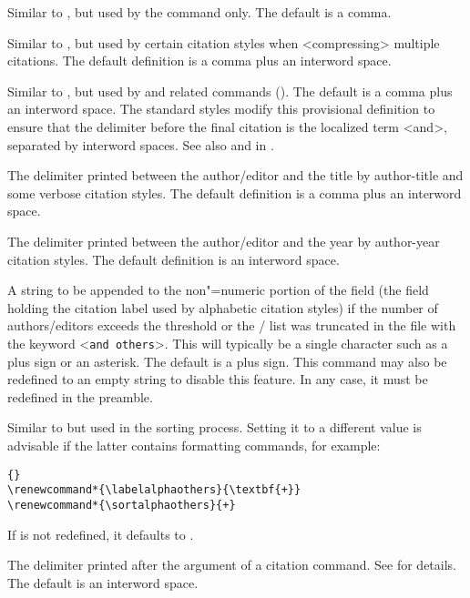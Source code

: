 \begin{ltxsyntax}
Similar to , but used by the  command only. The default is a comma.

Similar to , but used by certain citation styles when <compressing> multiple citations. The default definition is a comma plus an interword space.

Similar to , but used by  and related commands (). The default is a comma plus an interword space. The standard styles modify this provisional definition to ensure that the delimiter before the final citation is the localized term <and>, separated by interword spaces. See also  and  in .

The delimiter printed between the author\slash editor and the title by author-title and some verbose citation styles. The default definition is a comma plus an interword space.

The delimiter printed between the author\slash editor and the year by author-year citation styles. The default definition is an interword space.

A string to be appended to the non"=numeric portion of the  field (\ie the field holding the citation label used by alphabetic citation styles) if the number of authors\slash editors exceeds the  threshold or the \slash {} list was truncated in the  file with the keyword <\texttt{and others}>. This will typically be a single character such as a plus sign or an asterisk. The default is a plus sign. This command may also be redefined to an empty string to disable this feature. In any case, it must be redefined in the preamble.

\BiberOnlyMark
Similar to  but used in the sorting process. Setting it to a different value is advisable if the latter contains formatting commands, for example:

\begin{lstlisting}[style=latex]{}
\renewcommand*{\labelalphaothers}{\textbf{+}}
\renewcommand*{\sortalphaothers}{+}
\end{lstlisting}
%
If  is not redefined, it defaults to .

The delimiter printed after the  argument of a citation command. See  for details. The default is an interword space.


\end{ltxsyntax}
